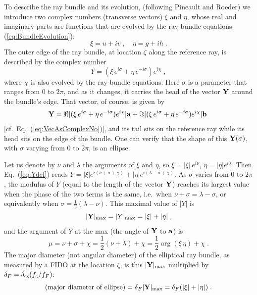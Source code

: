 \documentclass[12pt]{iopart}
\begin{document}
To describe the ray bundle and its evolution, (following Pineault and Roeder) we introduce two complex numbers
(transverse vectors) $\xi$ and $\eta$, whose real and imaginary parts are functions
that are evolved by the ray-bundle equations (\ref{eq:BundleEvolution}):
\begin{equation}
\xi = u+iv\;, \quad \eta = g+ih\;.
\label{eq:xieta}
\end{equation}
The outer edge of the ray bundle, at location $\zeta$ along the reference ray, 
is described by the complex number 
\begin{equation}
Y = ( \xi \,e^{i \sigma} + \eta\, e^{-i \sigma}) e^{i\chi}\;,
\label{eq:Ydef} 
\end{equation}
where $\chi$ is also evolved by the ray-bundle equations.
Here $\sigma$ is a parameter that ranges from $0$ to $2\pi$, 
and as it changes, it 
carries the head of the vector $\bf Y$ around the bundle's edge. That vector, 
of course, is given by 
\begin{equation}
{\bf Y} = {\Re}[(\xi\, e^{i \sigma} + \eta \,e^{-i\sigma})e^{i\chi}]{\bf a} +
{\Im}[(\xi \,e^{i \sigma} + \eta \,e^{-i\sigma})e^{i\chi}] {\bf b}\;
\label{eq:vecYval}
\end{equation}
[cf.\ Eq.\ (\ref{eq:VecAsComplexNo})], and its tail sits on the reference ray while its
head sits on the edge of the bundle.
One can verify that the shape of this ${\bf Y}(\sigma)$, with $\sigma$ varying
from 0 to $2\pi$, is an ellipse.

Let us denote by $\nu$ and $\lambda$ the arguments of $\xi$ and $\eta$,
so $\xi= |\xi|\, e^{i\nu}$, $\eta = |\eta| e^{i\lambda}$.  Then Eq.\ (\ref{eq:Ydef}) reads
$Y= |\xi| e^{i(\nu+\sigma+\chi)} +  |\eta| e^{i(\lambda-\sigma+\chi)}$.  
As $\sigma$ varies from 0 to $2\pi$,
the modulus of $Y$ (equal to the length of the vector $\bf Y$) reaches its largest value
when the phase of the two terms is the same, i.e.\ when $\nu+\sigma = \lambda - \sigma$,
or equivalently when $\sigma= \frac12(\lambda-\nu)$.  This maximal value of $|Y|$ is
\begin{equation}
|{\bf Y}|_{\rm max} = |Y|_{\rm max} = |\xi|+|\eta|\;,
\end{equation} 
and the argument of $Y$ at the max (the angle of 
$\bf Y$ to $\bf a$) is 
\begin{equation}
\mu = \nu + \sigma +\chi = \frac12(\nu+\lambda) +\chi = 
\frac12 \arg(\xi\, \eta) +\chi\;.
\label{eq:muevolve}
\end{equation}
The major diameter (not angular diameter) of the elliptical ray bundle, as 
measured by a FIDO at the location $\zeta$, is this
$|{\bf Y}|_{\rm max}$ multiplied by $\delta_F = \delta_{\rm cs} (f_c/f_F)$:  
\begin{equation}
\textrm{(major diameter of ellipse)} = \delta_F |{\bf Y}|_{\rm max}
= \delta_F (|\xi|+|\eta|)\;.
\label{eq:majordiameter}
\end{equation}
\end{document}
